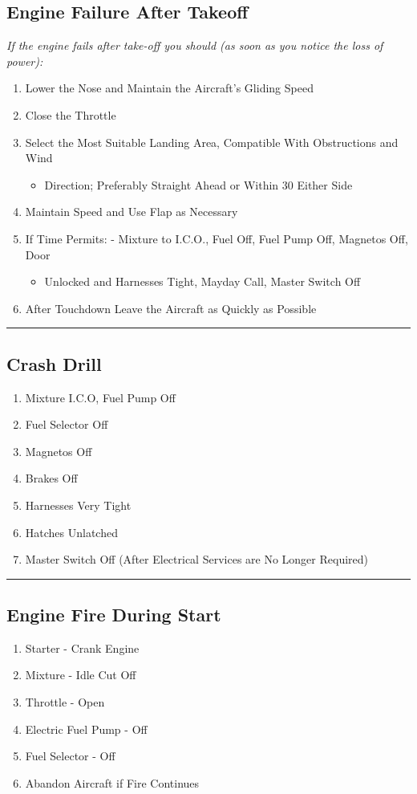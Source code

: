 \documentclass[a4paper]{article}
\newenvironment{checklist}{
  \begin{itemize}[leftmargin=*, align=left]
    \setlength{\itemsep}{2pt}
    \setlength{\parskip}{0pt}
    \setlength{\parsep}{0pt}
}{
  \end{itemize}
}
\newenvironment{numberedchecklist}{
  \begin{enumerate}[label=\arabic*., leftmargin=*, align=left]
    \setlength{\itemsep}{2pt}
    \setlength{\parskip}{0pt}
    \setlength{\parsep}{0pt}
}{
  \end{enumerate}
}
\begin{document}
\subsection*{Engine Failure After Takeoff}
\textit{If the engine fails after take-off you should (as soon as you notice the loss of power):}
\begin{numberedchecklist}
\item Lower the Nose and Maintain the Aircraft’s Gliding Speed
\item Close the Throttle
\item Select the Most Suitable Landing Area, Compatible With Obstructions and Wind
  \begin{checklist}
  \item Direction; Preferably Straight Ahead or Within 30\textdegree{} Either Side
  \end{checklist}
\item Maintain Speed and Use Flap as Necessary
\item If Time Permits: - Mixture to I.C.O., Fuel Off, Fuel Pump Off, Magnetos Off, Door
  \begin{checklist}
  \item Unlocked and Harnesses Tight, Mayday Call, Master Switch Off
  \end{checklist}
\item After Touchdown Leave the Aircraft as Quickly as Possible
\end{numberedchecklist}

\rule{\linewidth}{0.4pt}

\subsection*{Crash Drill}
\begin{numberedchecklist}
\item Mixture I.C.O, Fuel Pump Off
\item Fuel Selector Off
\item Magnetos Off
\item Brakes Off
\item Harnesses Very Tight
\item Hatches Unlatched
\item Master Switch Off (After Electrical Services are No Longer Required)
\end{numberedchecklist}

\rule{\linewidth}{0.4pt}

\subsection*{Engine Fire During Start}
\begin{numberedchecklist}
\item Starter - Crank Engine
\item Mixture - Idle Cut Off
\item Throttle - Open
\item Electric Fuel Pump - Off
\item Fuel Selector - Off
\item Abandon Aircraft if Fire Continues
\end{numberedchecklist}
\end{document}
